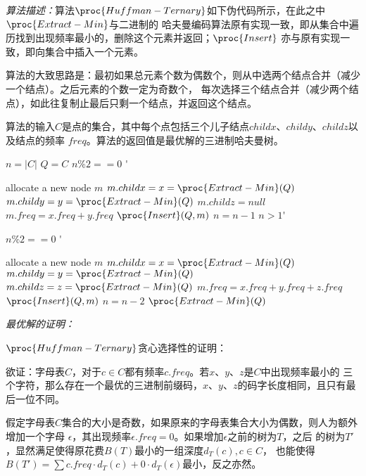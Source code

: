 \begin{solution}\textit{算法描述：}算法$\proc{Huffman-Ternary}$如下伪代码所示，在此之中$\proc{Extract-Min}$与二进制的
    哈夫曼编码算法原有实现一致，即从集合中遍历找到出现频率最小的，删除这个元素并返回；$\proc{Insert}$
    亦与原有实现一致，即向集合中插入一个元素。

    算法的大致思路是：最初如果总元素个数为偶数个，则从中选两个结点合并（减少一个结点）。之后元素的个数一定为奇数个，
    每次选择三个结点合并（减少两个结点），如此往复制止最后只剩一个结点，并返回这个结点。

    算法的输入$C$是点的集合，其中每个点包括三个儿子结点$childx$、$childy$、$childz$以及结点的频率
    $freq$。算法的返回值是最优解的三进制哈夫曼树。

    \newcommand{\Doo}{\>\textbf{}\hspace*{-0.7em}\'\addtocounter{indent}{1}}
    \begin{codebox}
        \li $n = |C|$
        \li $Q = C$
        \li \If $n \% 2 == 0$ \Doo
        \li     allocate a new node $m$
        \li     $ m.childx = x = \proc{Extract-Min}(Q)$
        \li     $ m.childy = y = \proc{Extract-Min}(Q)$
        \li     $ m.childz = null$       
        \li     $ m.freq = x.freq + y.freq$
        \li     $ \proc{Insert}(Q,m)$ 
        \li     $ n = n - 1$\End
        \li \While $n > 1$\Doo
        \li     \If $n \% 2 == 0$ \Doo
        \li         allocate a new node $m$
        \li         $ m.childx = x = \proc{Extract-Min}(Q)$
        \li         $ m.childy = y = \proc{Extract-Min}(Q)$
        \li         $ m.childz = z = \proc{Extract-Min}(Q)$
        \li         $ m.freq = x.freq + y.freq + z.freq$
        \li         $ \proc{Insert}(Q,m)$ 
        \li         $ n = n - 2$ \End \End
        \li \Return $\proc{Extract-Min}(Q)$
    \end{codebox}

    \textit{最优解的证明：}
    
    $\proc{Huffman-Ternary}$贪心选择性的证明：

    欲证：字母表$C$，对于$c \in C$都有频率$c.freq$。若$x$、$y$、$z$是$C$中出现频率最小的
    三个字符，那么存在一个最优的三进制前缀码，$x$、$y$、$z$的码字长度相同，且只有最后一位不同。
    
    假定字母表$C$集合的大小是奇数，如果原来的字母表集合大小为偶数，则人为额外增加一个字母
    $\epsilon$，其出现频率$\epsilon.freq=0$。如果增加$\epsilon$之前的树为$T$，之后
    的树为$T'$，显然满足使得原花费$B(T)$最小的一组深度$d_T(c), c \in C$，
    也能使得$B(T') = \sum c.freq \cdot d_T(c) + 0 \cdot d_T(\epsilon)$最小，反之亦然。
  

\end{solution}
